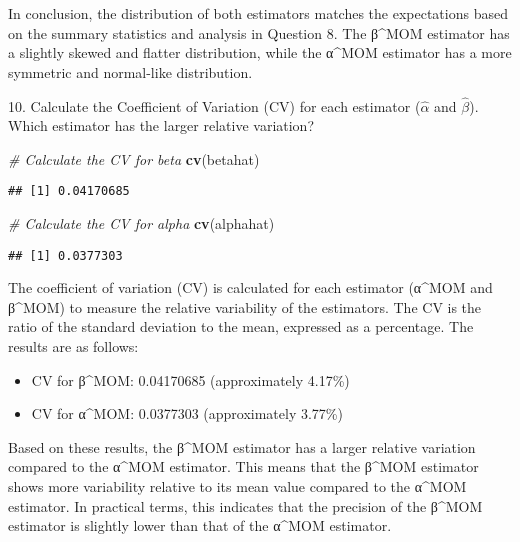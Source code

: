 \documentclass[
]{article}
\newenvironment{Shaded}{\begin{snugshade}}{\end{snugshade}}
\newcommand{\CommentTok}[1]{\textcolor[rgb]{0.56,0.35,0.01}{\textit{#1}}}
\newcommand{\FunctionTok}[1]{\textcolor[rgb]{0.13,0.29,0.53}{\textbf{#1}}}
\newcommand{\NormalTok}[1]{#1}
\providecommand{\tightlist}{%
  \setlength{\itemsep}{0pt}\setlength{\parskip}{0pt}}
\begin{document}
In conclusion, the distribution of both estimators matches the
expectations based on the summary statistics and analysis in Question 8.
The β\^{}MOM estimator has a slightly skewed and flatter distribution,
while the α\^{}MOM estimator has a more symmetric and normal-like
distribution.

{ 10. Calculate the Coefficient of Variation (CV) for each estimator
(\(\hat{\alpha}\) and \(\hat{\beta}\)). Which estimator has the larger
relative variation?}

\begin{Shaded}
\begin{Highlighting}[]
\CommentTok{\# Calculate the CV for beta}
\FunctionTok{cv}\NormalTok{(betahat)}
\end{Highlighting}
\end{Shaded}

\begin{verbatim}
## [1] 0.04170685
\end{verbatim}

\begin{Shaded}
\begin{Highlighting}[]
\CommentTok{\# Calculate the CV for alpha}
\FunctionTok{cv}\NormalTok{(alphahat)}
\end{Highlighting}
\end{Shaded}

\begin{verbatim}
## [1] 0.0377303
\end{verbatim}

The coefficient of variation (CV) is calculated for each estimator
(α\^{}MOM and β\^{}MOM) to measure the relative variability of the
estimators. The CV is the ratio of the standard deviation to the mean,
expressed as a percentage. The results are as follows:

\begin{itemize}
\tightlist
\item
  CV for β\^{}MOM: 0.04170685 (approximately 4.17\%)
\item
  CV for α\^{}MOM: 0.0377303 (approximately 3.77\%)
\end{itemize}

Based on these results, the β\^{}MOM estimator has a larger relative
variation compared to the α\^{}MOM estimator. This means that the
β\^{}MOM estimator shows more variability relative to its mean value
compared to the α\^{}MOM estimator. In practical terms, this indicates
that the precision of the β\^{}MOM estimator is slightly lower than that
of the α\^{}MOM estimator.
\end{document}
